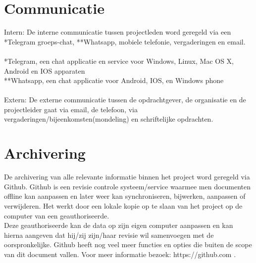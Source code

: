 \documentclass[oneside]{book}
\begin{document}
\section{Communicatie}
Intern:
De interne communicatie tussen projectleden word geregeld via een *Telegram groeps-chat,
**Whatsapp, mobiele telefonie, vergaderingen en email.\\
\\
 *Telegram, een chat applicatie en service voor Windows, Linux, Mac OS X, Android en IOS apparaten\\
**Whatsapp, een chat applicatie voor Android, IOS, en Windows phone\\
\\
Extern:
De externe communicatie tussen de opdrachtgever, de organisatie en de projectleider gaat via email,
de telefoon, via vergaderingen/bijeenkomsten(mondeling) en schriftelijke opdrachten.

\section{Archivering}
De archivering van alle relevante informatie binnen het project word geregeld via Github.
Github is een revisie controle systeem/service waarmee men documenten offline kan aanpassen en
later weer kan synchroniseren, bijwerken, aanpassen of verwijderen.
Het werkt door een lokale kopie op te slaan van het project op de computer van een
geauthoriseerde.\\
Deze geauthoriseerde kan de data op zijn eigen computer aanpassen en kan hierna aangeven dat
hij/zij zijn/haar revisie wil samenvoegen met de oorspronkelijke.
Github heeft nog veel meer functies en opties die buiten de scope van dit document vallen.
Voor meer informatie bezoek: https://github.com .
\end{document}
